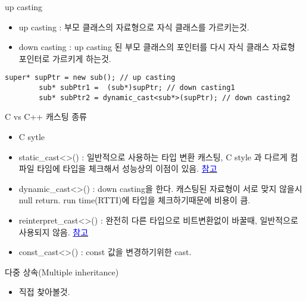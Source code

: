 \documentclass[10pt]{beamer}
\begin{document}
\begin{frame}[fragile]{up casting}
    \begin{itemize}
        \item up casting : 부모 클래스의 자료형으로 자식 클래스를 가르키는것.
        \item down casting : up casting 된 부모 클래스의 포인터를 다시 자식 클래스 자료형 포인터로 가르키게 하는것.
    \end{itemize}
    \begin{lstlisting}[style = CStyle]
        super* supPtr = new sub(); // up casting
        sub* subPtr1 =  (sub*)supPtr; // down casting1
        sub* subPtr2 = dynamic_cast<sub*>(supPtr); // down casting2
    \end{lstlisting}
\end{frame}


\begin{frame}{C vs C++ 캐스팅 종류}
    \begin{itemize}
        \item C sytle 
        \item static\_cast<>() : 일반적으로 사용하는 타입 변환 캐스팅, C style 과 다르게 컴파일 타임에 타입을 체크해서 성능상의 이점이 있음. \href{https://stackoverflow.com/questions/28002/regular-cast-vs-static-cast-vs-dynamic-cast}{\textcolor{blue}{참고}}
        \item dynamic\_cast<>() : down casting을 한다. 캐스팅된 자료형이 서로 맞지 않을시 null return. run time(RTTI)에 타입을 체크하기때문에 비용이 큼.
        \item reinterpret\_cast<>() : 완전히 다른 타입으로 비트변환없이 바꿀때, 일반적으로 사용되지 않음. \href{https://stackoverflow.com/questions/573294/when-to-use-reinterpret-cast}{\textcolor{blue}{참고}}
        \item const\_cast<>() : const 값을 변경하기위한 cast.
    \end{itemize}
\end{frame}


\begin{frame}{다중 상속(Multiple inheritance)}
    \begin{itemize}
        \item 직접 찾아볼것.
    \end{itemize}    
\end{frame}    
\end{document}
